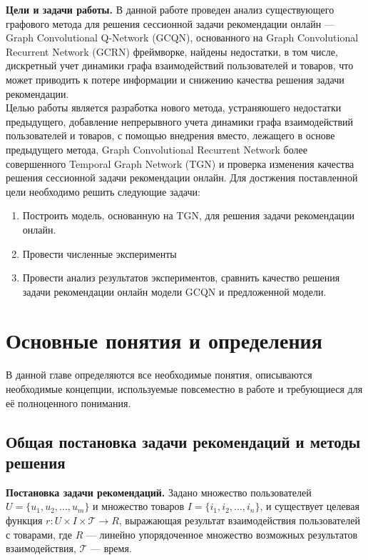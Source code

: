 \documentclass{mipt-thesis-ms}
\begin{document}
{\bf Цели и задачи работы.}
В данной работе проведен анализ существующего графового метода для решения сессионной задачи рекомендации онлайн --- Graph Convolutional Q-Network (GCQN), основанного на Graph Convolutional Recurrent Network (GCRN) фреймворке, найдены недостатки, в том числе, дискретный учет динамики графа взаимодействий пользователей и товаров, что может приводить к потере информации и снижению качества решения задачи рекомендации.\\

Целью работы является разработка нового метода, устраняюшего недостатки предыдущего, добавление непрерывного учета динамики графа взаимодействий пользователей и товаров, с помощью внедрения вместо, лежащего в основе предыдущего метода, Graph Convolutional Recurrent Network более совершенного Temporal Graph Network (TGN) и проверка изменения качества решения сессионной задачи рекомендации онлайн. Для достжения поставленной цели необходимо решить следующие задачи:
\begin{enumerate}
\item Построить модель, основанную на TGN, для решения задачи рекомендации онлайн.
\item Провести численные эксперименты
\item Провести анализ результатов экспериментов, сравнить качество решения задачи рекомендации онлайн модели GCQN и предложенной модели.
\end{enumerate}


\chapter{Основные понятия и определения}

В данной главе определяются все необходимые понятия, описываются необходимые концепции, используемые повсеместно в работе и требующиеся для её полноценного понимания.


\section{Общая постановка задачи рекомендаций и методы решения}
{\bf Постановка задачи рекомендаций.} 
Задано множество пользователей $U = \{u_1, u_2, \dots, u_m\}$ и множество товаров $I = \{i_1, i_2, \dots, i_n\}$, и существует целевая функция $r: U \times I \times \mathcal{T} \rightarrow R$, выражающая результат взаимодействия пользователей с товарами, где $R$ --- линейно упорядоченное множество возможных результатов взаимодействия, $\mathcal{T}$ --- время.\\
\end{document}
